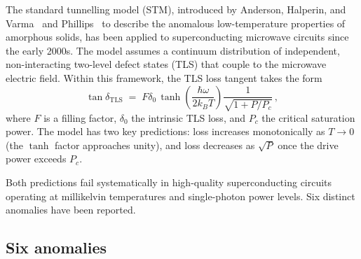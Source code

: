 \documentclass[11pt]{article}
\begin{document}
The standard tunnelling model (STM), introduced by Anderson, Halperin, and Varma~\cite{Anderson1972} and Phillips~\cite{Phillips1972} to describe the anomalous low-temperature properties of amorphous solids, has been applied to superconducting microwave circuits since the early 2000s.  The model assumes a continuum distribution of independent, non-interacting two-level defect states (TLS) that couple to the microwave electric field.  Within this framework, the TLS loss tangent takes the form
\begin{equation}\label{eq:STM_loss}
\tan\delta_{\mathrm{TLS}} \;=\; F\delta_0 \,\tanh\!\left(\frac{\hbar\omega}{2k_BT}\right) \frac{1}{\sqrt{1 + P/P_c}}\,,
\end{equation}
where $F$ is a filling factor, $\delta_0$ the intrinsic TLS loss, and $P_c$ the critical saturation power.  The model has two key predictions: loss increases monotonically as $T \to 0$ (the $\tanh$ factor approaches unity), and loss decreases as $\sqrt{P}$ once the drive power exceeds $P_c$.

Both predictions fail systematically in high-quality superconducting circuits operating at millikelvin temperatures and single-photon power levels.  Six distinct anomalies have been reported.

\subsection{Six anomalies}
\end{document}

